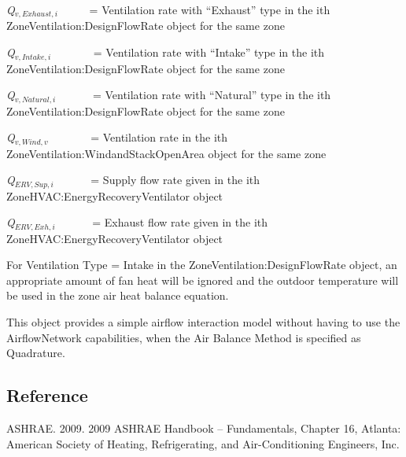 \emph{Q\(_{v,Exhaust,i}\)}~~~~~ = Ventilation rate with ``Exhaust'' type in the ith ZoneVentilation:DesignFlowRate object for the same zone

\emph{Q\(_{v,Intake,i}\)}~~~~~~~ = Ventilation rate with ``Intake'' type in the ith ZoneVentilation:DesignFlowRate object for the same zone

\emph{Q\(_{v,Natural,i}\)}~~~~~~ = Ventilation rate with ``Natural'' type in the ith ZoneVentilation:DesignFlowRate object for the same zone

\emph{Q\(_{v,Wind,v}\)}~~~~~~~ = Ventilation rate in the ith ZoneVentilation:WindandStackOpenArea object for the same zone

\emph{Q\(_{ERV,Sup,i}\)}~~~~~~ = Supply flow rate given in the ith ZoneHVAC:EnergyRecoveryVentilator object

\emph{Q\(_{ERV,Exh,i}\)}~~~~~~ = Exhaust flow rate given in the ith ZoneHVAC:EnergyRecoveryVentilator object

For Ventilation Type = Intake in the ZoneVentilation:DesignFlowRate object, an appropriate amount of fan heat will be ignored and the outdoor temperature will be used in the zone air heat balance equation.

This object provides a simple airflow interaction model without having to use the AirflowNetwork capabilities, when the Air Balance Method is specified as Quadrature.

\subsection{Reference}\label{reference}

ASHRAE. 2009. 2009 ASHRAE Handbook -- Fundamentals, Chapter 16, Atlanta: American Society of Heating, Refrigerating, and Air-Conditioning Engineers, Inc.
